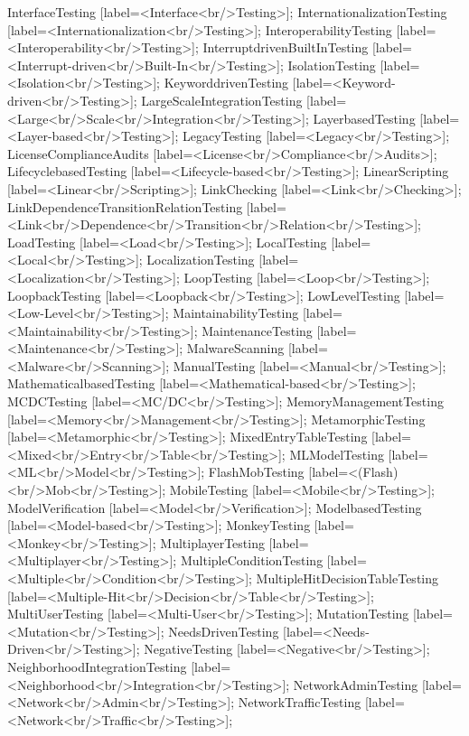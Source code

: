 \documentclass{article}
\begin{document}
{InterfaceTesting [label=<Interface<br/>Testing>];
InternationalizationTesting [label=<Internationalization<br/>Testing>];
InteroperabilityTesting [label=<Interoperability<br/>Testing>];
InterruptdrivenBuiltInTesting [label=<Interrupt-driven<br/>Built-In<br/>Testing>];
IsolationTesting [label=<Isolation<br/>Testing>];
KeyworddrivenTesting [label=<Keyword-driven<br/>Testing>];
LargeScaleIntegrationTesting [label=<Large<br/>Scale<br/>Integration<br/>Testing>];
LayerbasedTesting [label=<Layer-based<br/>Testing>];
LegacyTesting [label=<Legacy<br/>Testing>];
LicenseComplianceAudits [label=<License<br/>Compliance<br/>Audits>];
LifecyclebasedTesting [label=<Lifecycle-based<br/>Testing>];
LinearScripting [label=<Linear<br/>Scripting>];
LinkChecking [label=<Link<br/>Checking>];
LinkDependenceTransitionRelationTesting [label=<Link<br/>Dependence<br/>Transition<br/>Relation<br/>Testing>];
LoadTesting [label=<Load<br/>Testing>];
LocalTesting [label=<Local<br/>Testing>];
LocalizationTesting [label=<Localization<br/>Testing>];
LoopTesting [label=<Loop<br/>Testing>];
LoopbackTesting [label=<Loopback<br/>Testing>];
LowLevelTesting [label=<Low-Level<br/>Testing>];
MaintainabilityTesting [label=<Maintainability<br/>Testing>];
MaintenanceTesting [label=<Maintenance<br/>Testing>];
MalwareScanning [label=<Malware<br/>Scanning>];
ManualTesting [label=<Manual<br/>Testing>];
MathematicalbasedTesting [label=<Mathematical-based<br/>Testing>];
MCDCTesting [label=<MC/DC<br/>Testing>];
MemoryManagementTesting [label=<Memory<br/>Management<br/>Testing>];
MetamorphicTesting [label=<Metamorphic<br/>Testing>];
MixedEntryTableTesting [label=<Mixed<br/>Entry<br/>Table<br/>Testing>];
MLModelTesting [label=<ML<br/>Model<br/>Testing>];
FlashMobTesting [label=<(Flash)<br/>Mob<br/>Testing>];
MobileTesting [label=<Mobile<br/>Testing>];
ModelVerification [label=<Model<br/>Verification>];
ModelbasedTesting [label=<Model-based<br/>Testing>];
MonkeyTesting [label=<Monkey<br/>Testing>];
MultiplayerTesting [label=<Multiplayer<br/>Testing>];
MultipleConditionTesting [label=<Multiple<br/>Condition<br/>Testing>];
MultipleHitDecisionTableTesting [label=<Multiple-Hit<br/>Decision<br/>Table<br/>Testing>];
MultiUserTesting [label=<Multi-User<br/>Testing>];
MutationTesting [label=<Mutation<br/>Testing>];
NeedsDrivenTesting [label=<Needs-Driven<br/>Testing>];
NegativeTesting [label=<Negative<br/>Testing>];
NeighborhoodIntegrationTesting [label=<Neighborhood<br/>Integration<br/>Testing>];
NetworkAdminTesting [label=<Network<br/>Admin<br/>Testing>];
NetworkTrafficTesting [label=<Network<br/>Traffic<br/>Testing>];
}
\end{document}
